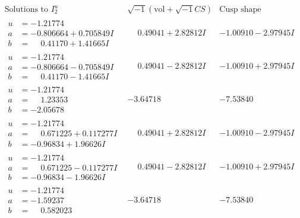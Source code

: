 \documentclass[1p]{elsarticle_modified}
\theoremstyle{definition}
\newcommand{\I}{\sqrt{-1}}
\begin{document}
$$\begin{array}{c|c|c}  
\text{Solutions to }I^u_{2}& \I (\text{vol} + \sqrt{-1}CS) & \text{Cusp shape}\\
 \hline 
\begin{aligned}
u &= -1.21774\phantom{ +0.000000I} \\
a &= -0.806664 + 0.705849 I \\
b &= \phantom{-}0.41170 + 1.41665 I\end{aligned}
 & \phantom{-}0.49041 + 2.82812 I & -1.00910 - 2.97945 I \\ \hline\begin{aligned}
u &= -1.21774\phantom{ +0.000000I} \\
a &= -0.806664 - 0.705849 I \\
b &= \phantom{-}0.41170 - 1.41665 I\end{aligned}
 & \phantom{-}0.49041 - 2.82812 I & -1.00910 + 2.97945 I \\ \hline\begin{aligned}
u &= -1.21774\phantom{ +0.000000I} \\
a &= \phantom{-}1.23353\phantom{ +0.000000I} \\
b &= -2.05678\phantom{ +0.000000I}\end{aligned}
 & -3.64718\phantom{ +0.000000I} & -7.53840\phantom{ +0.000000I} \\ \hline\begin{aligned}
u &= -1.21774\phantom{ +0.000000I} \\
a &= \phantom{-}0.671225 + 0.117277 I \\
b &= -0.96834 + 1.96626 I\end{aligned}
 & \phantom{-}0.49041 + 2.82812 I & -1.00910 - 2.97945 I \\ \hline\begin{aligned}
u &= -1.21774\phantom{ +0.000000I} \\
a &= \phantom{-}0.671225 - 0.117277 I \\
b &= -0.96834 - 1.96626 I\end{aligned}
 & \phantom{-}0.49041 - 2.82812 I & -1.00910 + 2.97945 I \\ \hline\begin{aligned}
u &= -1.21774\phantom{ +0.000000I} \\
a &= -1.59237\phantom{ +0.000000I} \\
b &= \phantom{-}0.582023\phantom{ +0.000000I}\end{aligned}
 & -3.64718\phantom{ +0.000000I} & -7.53840\phantom{ +0.000000I} \\ \hline\begin{aligned}

\end{aligned}
\end{array}$$
\end{document}
